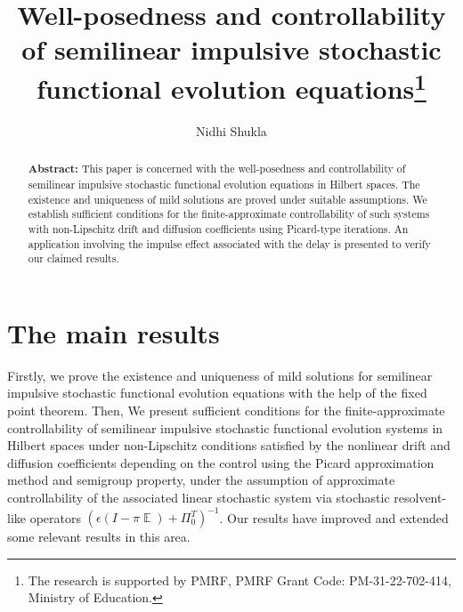 \documentclass[12pt]{llncs}
\begin{document}
\fi
%
\title{Well-posedness and controllability of semilinear impulsive stochastic functional evolution equations\thanks{The research is supported by PMRF, PMRF Grant Code: PM-31-22-702-414, Ministry of Education.}}
\author{Nidhi Shukla}
 

\maketitle

\begin{abstract}
\textbf{Abstract:} This paper is concerned with the well-posedness and controllability of semilinear impulsive stochastic functional evolution equations in Hilbert spaces. The existence and uniqueness of mild solutions are proved under suitable assumptions. We establish sufficient conditions for the finite-approximate controllability of such systems with non-Lipschitz drift and diffusion coefficients using Picard-type iterations. An application involving the impulse effect associated with the delay is presented to verify our claimed results.

\end{abstract}

\section{The main results}
Firstly, we prove the existence and uniqueness of mild solutions for semilinear impulsive stochastic functional evolution equations with the help of the fixed point theorem. Then, We present sufficient conditions for the finite-approximate controllability of semilinear impulsive stochastic functional evolution systems in Hilbert spaces under non-Lipschitz conditions satisfied by the nonlinear drift and diffusion coefficients depending on the control using the Picard approximation method and semigroup property, under the assumption of approximate controllability of the associated linear stochastic system via stochastic resolvent-like operators 
$(\epsilon(I-\pi \mathop{\mathbb{E}(\cdot)})+\Pi^T_{0})^{-1}$. Our results have improved and extended some relevant results in this area.
\end{document}
